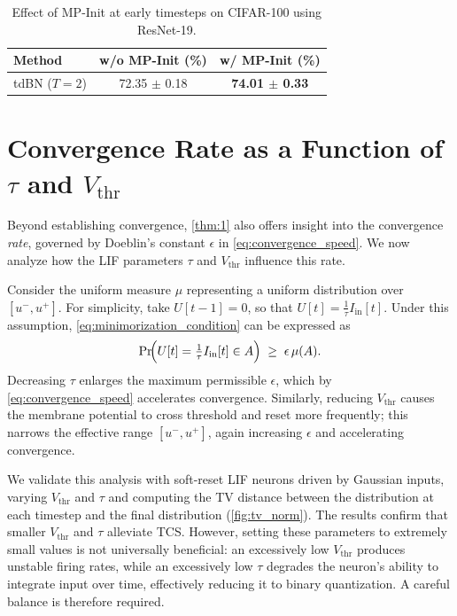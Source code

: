 \begin{table}[h]
\centering
\small
\begin{tabular}{lcc}
\toprule
\textbf{Method} & \textbf{w/o MP-Init (\%)} & \textbf{w/ MP-Init (\%)} \\
\midrule
tdBN ($T=2$) & 72.35 $\pm$ 0.18 & \textbf{74.01 $\pm$ 0.33} \\
\bottomrule
\end{tabular}
\caption{Effect of MP-Init at early timesteps on CIFAR-100 using ResNet-19.}
\label{tab:convergence-mpinit}
\end{table}

\section{Convergence Rate as a Function of \texorpdfstring{$\tau$ and $V_{\text{thr}}$}{tau and Vthr}}
\label{sec:mpinit_convergence_rate}

Beyond establishing convergence, \cref{thm:1} also offers insight into the convergence \emph{rate}, governed by Doeblin's constant $\epsilon$ in \cref{eq:convergence_speed}. We now analyze how the LIF parameters $\tau$ and $V_{\text{thr}}$ influence this rate.

Consider the uniform measure $\mu$ representing a uniform distribution over $[u^{-},u^{+}]$. For simplicity, take $U[t-1]=0$, so that $U[t]=\tfrac{1}{\tau}I_{\text{in}}[t]$. Under this assumption, \cref{eq:minimorization_condition} can be expressed as
\begin{equation}
    \Pr\!\Bigl(U[t]=\tfrac{1}{\tau}I_{\text{in}}[t]\in A\Bigr) \;\ge\; \epsilon\,\mu(A).
\end{equation}
Decreasing $\tau$ enlarges the maximum permissible $\epsilon$, which by \cref{eq:convergence_speed} accelerates convergence. Similarly, reducing $V_{\text{thr}}$ causes the membrane potential to cross threshold and reset more frequently; this narrows the effective range $[u^{-},u^{+}]$, again increasing $\epsilon$ and accelerating convergence.

We validate this analysis with soft-reset LIF neurons driven by Gaussian inputs, varying $V_{\text{thr}}$ and $\tau$ and computing the TV distance between the distribution at each timestep and the final distribution (\cref{fig:tv_norm}). The results confirm that smaller $V_{\text{thr}}$ and $\tau$ alleviate TCS. However, setting these parameters to extremely small values is not universally beneficial: an excessively low $V_{\text{thr}}$ produces unstable firing rates, while an excessively low $\tau$ degrades the neuron's ability to integrate input over time, effectively reducing it to binary quantization. A careful balance is therefore required.

